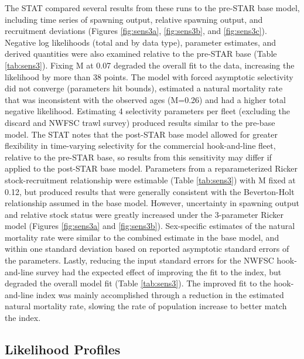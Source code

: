\documentclass[11pt,
  english,
]{article}
\begin{document}
The STAT compared several results from these runs to the pre-STAR base model, including time series of spawning output, relative spawning output, and recruitment deviations (Figures \ref{fig:sens3a}, \ref{fig:sens3b}, and \ref{fig:sens3c}). Negative log likelihoods (total and by data type), parameter estimates, and derived quantities were also examined relative to the pre-STAR base (Table \ref{tab:sens3}). Fixing M at 0.07 degraded the overall fit to the data, increasing the likelihood by more than 38 points. The model with forced asymptotic selectivity did not converge (parameters hit bounds), estimated a natural mortality rate that was inconsistent with the observed ages (M=0.26) and had a higher total negative likelihood. Estimating 4 selectivity parameters per fleet (excluding the discard and NWFSC trawl survey) produced results similar to the pre-base model. The STAT notes that the post-STAR base model allowed for greater flexibility in time-varying selectivity for the commercial hook-and-line fleet, relative to the pre-STAR base, so results from this sensitivity may differ if applied to the post-STAR base model. Parameters from a reparameterized Ricker stock-recruitment relationship were estimable (Table \ref{tab:sens3}) with M fixed at 0.12, but produced results that were generally consistent with the Beverton-Holt relationship assumed in the base model. However, uncertainty in spawning output and relative stock status were greatly increased under the 3-parameter Ricker model (Figures \ref{fig:sens3a} and \ref{fig:sens3b}). Sex-specific estimates of the natural mortality rate were similar to the combined estimate in the base model, and within one standard deviation based on reported asymptotic standard errors of the parameters. Lastly, reducing the input standard errors for the NWFSC hook-and-line survey had the expected effect of improving the fit to the index, but degraded the overall model fit (Table \ref{tab:sens3}). The improved fit to the hook-and-line index was mainly accomplished through a reduction in the estimated natural mortality rate, slowing the rate of population increase to better match the index.


\hypertarget{likelihood-profiles}{%
\subsection{Likelihood Profiles}\label{likelihood-profiles}}

\leavevmode\tagmcend\tagstructend
\end{document}
